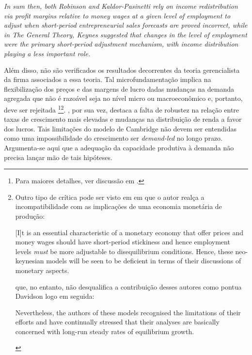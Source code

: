 \begin{citacao}
	\textit{
		In sum then, both Robinson and Kaldor-Pasinetti rely on	income redistribution via profit margins relative to money wages at a given level of employment to adjust when short-period entrepreneurial sales forecasts are proved incorrect,
		while in The General Theory, Keynes suggested that changes in the level of employment were the primary short-period adjustment mechanism, with income distribution playing a less important role.	
	} \cite[p.~127]{davidson_accumulation_1978}
\end{citacao}
Além disso, não são verificados os resultados decorrentes da teoria gerencialista da firma associados a essa teoria.
Tal microfundamentação implica na flexibilização dos preços e das margens de lucro dadas mudanças na demanda agregada que não é razoável seja no nível micro ou macroeconômico  e, portanto, deve ser rejeitada
\footnote{Para maiores detalhes, ver discussão em \textcites{ciccone_2017}[p.~104--5, n. 17]{serrano_teoria_1988}.}\footnote{
	Outro tipo de crítica pode ser visto em \textcite[p.~127]{davidson_accumulation_1978} em que o autor realça a incompatibilidade com as implicações de uma economia monetária de produção:
	\begin{citacao}
		
		[I]t is an essential characteristic of a monetary economy that offer
		prices and money wages should have short-period stickiness
		and hence employment levels \textit{must} be more adjustable to disequilibrium conditions. Hence, these neo-keynesian models
		will be seen to be deficient in terms of their discussions of
		monetary aspects.
	\end{citacao}
que, no entanto, não desqualifica a contribuição desses autores como pontua Davidson logo em seguida:

	\begin{citacao}
		Nevertheless, the authors of these models
		recognised the limitations of their efforts and have continually
		stressed that their analyses are basically concerned with long-run steady rates of equilibrium growth.
	\end{citacao}
}. \textcite[p.~158]{cesaratto_neo-kaleckian_2015}, por sua vez, destaca a falta de robustez na relação entre taxas de crescimento mais elevadas e mudanças na distribuição de renda a favor dos lucros.
Tais limitações do modelo de Cambridge não devem ser entendidas como uma impossibilidade do crescimento ser \textit{demand-led} no longo prazo. Argumenta-se aqui que a adequação da capacidade produtiva à demanda não precisa lançar mão de tais hipóteses. 

